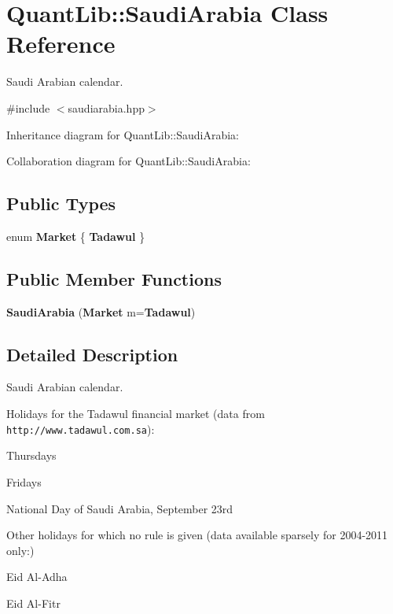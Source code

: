 \section{Quant\+Lib\+:\+:Saudi\+Arabia Class Reference}
\label{class_quant_lib_1_1_saudi_arabia}


Saudi Arabian calendar.  




{\ttfamily \#include $<$saudiarabia.\+hpp$>$}



Inheritance diagram for Quant\+Lib\+:\+:Saudi\+Arabia\+:


Collaboration diagram for Quant\+Lib\+:\+:Saudi\+Arabia\+:
\subsection*{Public Types}
\begin{DoxyCompactItemize}
\item 
enum {\bf Market} \{ {\bf Tadawul}
 \}
\end{DoxyCompactItemize}
\subsection*{Public Member Functions}
\begin{DoxyCompactItemize}
\item 
{\bf Saudi\+Arabia} ({\bf Market} m={\bf Tadawul})
\end{DoxyCompactItemize}


\subsection{Detailed Description}
Saudi Arabian calendar. 

Holidays for the Tadawul financial market (data from {\tt http\+://www.\+tadawul.\+com.\+sa})\+: 
\begin{DoxyItemize}
\item Thursdays 
\item Fridays 
\item National Day of Saudi Arabia, September 23rd 
\end{DoxyItemize}

Other holidays for which no rule is given (data available sparsely for 2004-\/2011 only\+:) 
\begin{DoxyItemize}
\item Eid Al-\/\+Adha 
\item Eid Al-\/\+Fitr 
\end{DoxyItemize}

